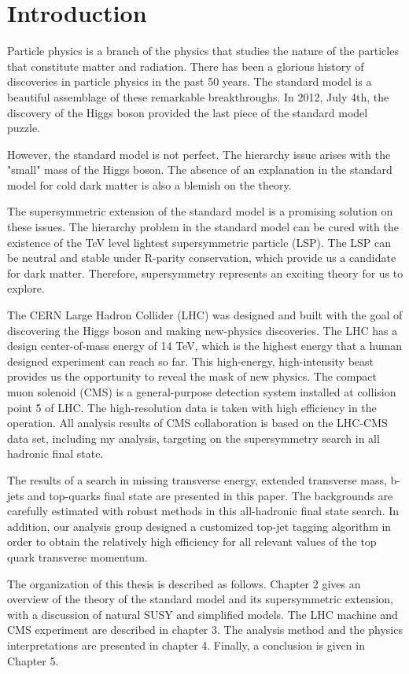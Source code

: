 \chapter{Introduction}
Particle physics is a branch of the physics that studies the nature of the particles that constitute matter and radiation. There has been a glorious history of discoveries in particle physics in the past 50 years. The standard model is a beautiful assemblage of these remarkable breakthroughs. In 2012, July 4th, the discovery of the Higgs boson provided the last piece of the standard model puzzle.

However, the standard model is not perfect. The hierarchy issue arises with the "small" mass of the Higgs boson. The absence of an explanation in the standard model for cold dark matter is also a blemish on the theory.

The supersymmetric extension of the standard model is a promising solution on these issues. The hierarchy problem in the standard model can be cured with the existence of the TeV level lightest supersymmetric particle (LSP). The LSP can be neutral and stable under R-parity conservation, which provide us a candidate for dark matter. Therefore, supersymmetry represents an exciting theory for us to explore.

The CERN Large Hadron Collider (LHC) was designed and built with the goal of discovering the Higgs boson and making new-physics discoveries. The LHC has a design center-of-mass energy of 14 TeV, which is the highest energy that a human designed experiment can reach so far. This high-energy, high-intensity beast provides us the opportunity to reveal the mask of new physics. The compact muon solenoid (CMS) is a general-purpose detection system installed at collision point 5 of LHC. The high-resolution data is taken with high efficiency in the operation. All analysis results of CMS collaboration is based on the LHC-CMS data set, including my analysis, targeting on the supersymmetry search in all hadronic final state.

The results of a search in missing transverse energy, extended transverse mass, b-jets and top-quarks final state are presented in this paper. The backgrounds are carefully estimated with robust methods in this all-hadronic final state search. In addition, our analysis group designed a customized top-jet tagging algorithm in order to obtain the relatively high efficiency for all relevant values of the top quark transverse momentum.

The organization of this thesis is described as follows. Chapter 2 gives an overview of the theory of the standard model and its supersymmetric extension, with a discussion of natural SUSY and simplified models. The LHC machine and CMS experiment are described in chapter 3. The analysis method and the physics interpretations are presented in chapter 4. Finally, a conclusion is given in Chapter 5.
